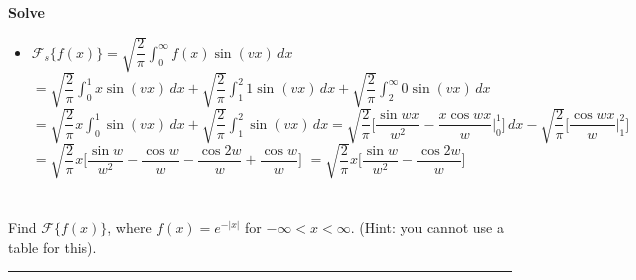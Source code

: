\documentclass[10pt]{article}
\begin{document}
\noindent
\textbf{Solve}  \\

\begin{itemize}
    \item $ \displaystyle \mathcal{F}_s\{f(x)\} = \sqrt{\dfrac{2}{\pi}} \int_{0}^{\infty} f(x) \sin(vx) \,dx $
    \subitem  $ \displaystyle = \sqrt{\dfrac{2}{\pi}} \int_{0}^{1} x \sin(vx) \,dx + \sqrt{\dfrac{2}{\pi}} \int_{1}^{2} 1 \sin(vx) \,dx + \sqrt{\dfrac{2}{\pi}} \int_{2}^{\infty} 0 \sin(vx) \,dx $
    \subitem  $ \displaystyle = \sqrt{\dfrac{2}{\pi}}x \int_{0}^{1} \sin(vx) \,dx + \sqrt{\dfrac{2}{\pi}} \int_{1}^{2} \sin(vx) \,dx
    = \sqrt{\dfrac{2}{\pi}} \Big[\dfrac{\sin{wx}}{w^2} - \dfrac{x\cos{wx}}{w} \Big|_{0}^{1} \Big] \,dx - \sqrt{\dfrac{2}{\pi}} \Big[\dfrac{\cos{wx}}{w} \Big|_{1}^{2} \Big] $
    \subitem  $ \displaystyle = \sqrt{\dfrac{2}{\pi}}x \Big[\dfrac{\sin{w}}{w^2} - \dfrac{\cos{w}}{w} - \dfrac{\cos{2w}}{w} + \dfrac{\cos{w}}{w} \Big] $
    \subitem  $ \displaystyle = \sqrt{\dfrac{2}{\pi}}x \Big[\dfrac{\sin{w}}{w^2} - \dfrac{\cos{2w}}{w} \Big] $
\end{itemize}

\newpage

\section{\underline{}}
\label{sec: Problem 3}
\noindent
Find $ \mathcal{F}\{f(x)\} $, where $ f(x)=e^{-|x|} $ for $ -\infty < x < \infty $. (Hint: you cannot use a table for this). \\
\vspace{2.5mm}
\hrule

\vspace{7.5mm}
\end{document}
